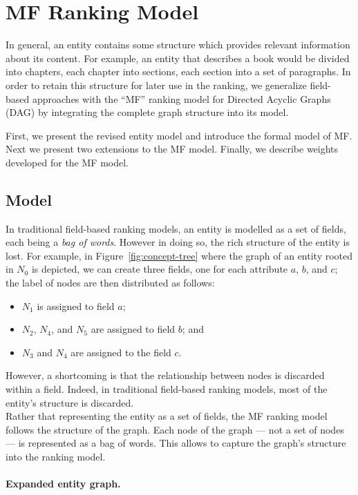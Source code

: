 \section{MF Ranking Model}
\label{chap:tree-ranking:mf-model}

In general, an entity contains some structure which provides relevant information about its content. For example, an entity that describes a book would be divided into chapters, each chapter into sections, each section into a set of paragraphs. In order to retain this structure for later use in the ranking, we generalize field-based approaches with the ``MF'' ranking model for Directed Acyclic Graphs (DAG) by integrating the complete graph structure into its model.

First, we present the revised entity model and introduce the formal model of MF. Next we present two extensions to the MF model. Finally, we describe weights developed for the MF model.

\subsection{Model}

In traditional field-based ranking models, an entity is modelled as a set of fields, each being a \emph{bag of words}. However in doing so, the rich structure of the entity is lost. For example, in Figure~\ref{fig:concept-tree} where the graph of an entity rooted in $N_0$ is depicted, we can create three fields, one for each attribute $a$, $b$, and $c$; the label of nodes are then distributed as follows:
\begin{itemize}
	\item $N_1$ is assigned to field $a$;
	\item $N_2$, $N_4$, and $N_5$ are assigned to field $b$; and
	\item $N_3$ and $N_4$ are assigned to the field $c$.
\end{itemize}
However, a shortcoming is that the relationship between nodes is discarded within a field. Indeed, in traditional field-based ranking models, most of the entity's structure is discarded.\\

Rather that representing the entity as a set of fields, the MF ranking model follows the structure of the graph. Each node of the graph --- not a set of nodes --- is represented as a bag of words. This allows to capture the graph's structure into the ranking model.

\paragraph{Expanded entity graph.}

